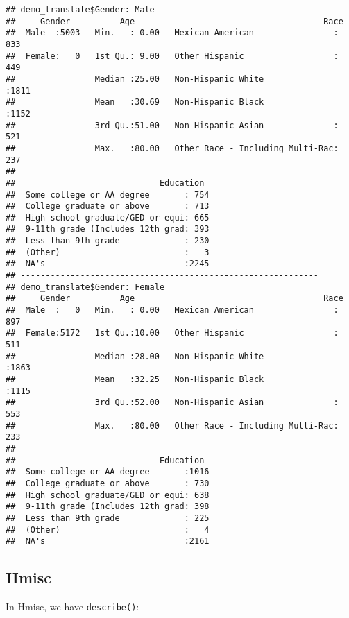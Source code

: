 \documentclass[
]{book}
\newenvironment{Shaded}{\begin{snugshade}}{\end{snugshade}}
\newcommand{\FunctionTok}[1]{\textcolor[rgb]{0.00,0.00,0.00}{#1}}
\newcommand{\NormalTok}[1]{#1}
\newcommand{\SpecialCharTok}[1]{\textcolor[rgb]{0.00,0.00,0.00}{#1}}
\begin{document}
\begin{Shaded}
\end{Shaded}

\begin{verbatim}
## demo_translate$Gender: Male
##     Gender          Age                                      Race
##  Male  :5003   Min.   : 0.00   Mexican American                : 833
##  Female:   0   1st Qu.: 9.00   Other Hispanic                  : 449
##                Median :25.00   Non-Hispanic White              :1811
##                Mean   :30.69   Non-Hispanic Black              :1152
##                3rd Qu.:51.00   Non-Hispanic Asian              : 521
##                Max.   :80.00   Other Race - Including Multi-Rac: 237
##
##                             Education
##  Some college or AA degree       : 754
##  College graduate or above       : 713
##  High school graduate/GED or equi: 665
##  9-11th grade (Includes 12th grad: 393
##  Less than 9th grade             : 230
##  (Other)                         :   3
##  NA's                            :2245
## ------------------------------------------------------------
## demo_translate$Gender: Female
##     Gender          Age                                      Race
##  Male  :   0   Min.   : 0.00   Mexican American                : 897
##  Female:5172   1st Qu.:10.00   Other Hispanic                  : 511
##                Median :28.00   Non-Hispanic White              :1863
##                Mean   :32.25   Non-Hispanic Black              :1115
##                3rd Qu.:52.00   Non-Hispanic Asian              : 553
##                Max.   :80.00   Other Race - Including Multi-Rac: 233
##
##                             Education
##  Some college or AA degree       :1016
##  College graduate or above       : 730
##  High school graduate/GED or equi: 638
##  9-11th grade (Includes 12th grad: 398
##  Less than 9th grade             : 225
##  (Other)                         :   4
##  NA's                            :2161
\end{verbatim}

\hypertarget{hmisc}{%
\subsection{Hmisc}\label{hmisc}}

In Hmisc, we have \texttt{describe()}:
\end{document}
